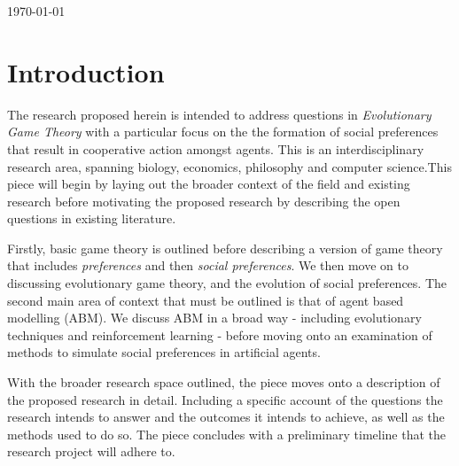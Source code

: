 \documentclass[12pt]{article}
\newcommand*{\np}{\par\noindent\newline}
\begin{document}
\begin{titlepage}
	\vfill\vfill\vfill %
	
	{\large\today} %
	
	
	 
	
	\vfill %
	
\end{titlepage}
\hypersetup{colorlinks, citecolor=black, filecolor=black, linkcolor=black urlcolor=black}

\newpage
\tableofcontents
\newpage
\section{Introduction}
The research proposed herein is intended to address questions in \textit{Evolutionary Game Theory} with a particular focus on the the formation
of social preferences that result in cooperative action amongst agents. This is
an interdisciplinary research area, spanning biology, economics, philosophy and
computer science.This piece will begin by laying out the broader context of the
field and existing research before motivating the proposed research by
describing the open questions in existing literature.
\np Firstly, basic game theory is outlined before describing a version of
game theory that includes \textit{preferences} and then \textit{social
preferences}. We then move on to discussing evolutionary game theory, and the
evolution of social preferences. The second main area of context that must be
outlined is that of agent based modelling (ABM). We discuss ABM in a broad way
- including evolutionary techniques and reinforcement learning - before moving
onto an examination of methods to simulate social preferences in artificial
agents.
\np With the broader research space outlined, the piece moves onto a
description of the proposed research in detail. Including a specific account of
the questions the research intends to answer and the outcomes it intends to
achieve, as well as the methods used to do so. The piece concludes with a
preliminary timeline that the research project will adhere to. 
\end{document}
